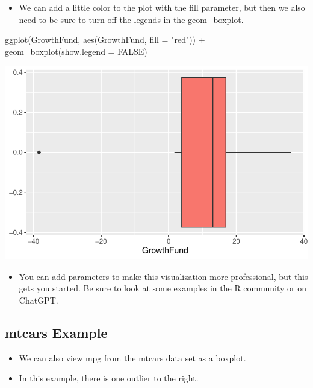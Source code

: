 \documentclass[
  letterpaper,
  DIV=11,
  numbers=noendperiod]{scrreprt}
\newenvironment{Shaded}{\begin{snugshade}}{\end{snugshade}}
\newcommand{\AttributeTok}[1]{\textcolor[rgb]{0.40,0.45,0.13}{#1}}
\newcommand{\ConstantTok}[1]{\textcolor[rgb]{0.56,0.35,0.01}{#1}}
\newcommand{\FunctionTok}[1]{\textcolor[rgb]{0.28,0.35,0.67}{#1}}
\newcommand{\NormalTok}[1]{\textcolor[rgb]{0.00,0.23,0.31}{#1}}
\newcommand{\SpecialCharTok}[1]{\textcolor[rgb]{0.37,0.37,0.37}{#1}}
\newcommand{\StringTok}[1]{\textcolor[rgb]{0.13,0.47,0.30}{#1}}
\providecommand{\tightlist}{%
  \setlength{\itemsep}{0pt}\setlength{\parskip}{0pt}}\usepackage{longtable,booktabs,array}
\begin{document}
\begin{itemize}
\tightlist
\item
  We can add a little color to the plot with the fill parameter, but
  then we also need to be sure to turn off the legends in the
  geom\_boxplot.
\end{itemize}

\begin{Shaded}
\begin{Highlighting}[]
\FunctionTok{ggplot}\NormalTok{(GrowthFund, }\FunctionTok{aes}\NormalTok{(GrowthFund, }\AttributeTok{fill =} \StringTok{"red"}\NormalTok{)) }\SpecialCharTok{+} \FunctionTok{geom\_boxplot}\NormalTok{(}\AttributeTok{show.legend =} \ConstantTok{FALSE}\NormalTok{)}
\end{Highlighting}
\end{Shaded}

\includegraphics{dataviz_files/figure-pdf/unnamed-chunk-31-1.pdf}

\begin{itemize}
\tightlist
\item
  You can add parameters to make this visualization more professional,
  but this gets you started. Be sure to look at some examples in the R
  community or on ChatGPT.
\end{itemize}

\subsection{mtcars Example}\label{mtcars-example}

\begin{itemize}
\tightlist
\item
  We can also view mpg from the mtcars data set as a boxplot.
\item
  In this example, there is one outlier to the right.
\end{itemize}
\end{document}
